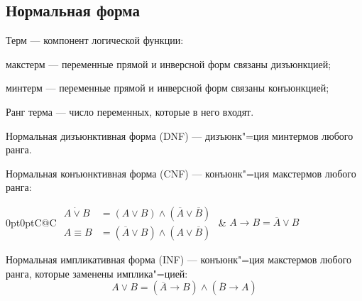 \subsection{Нормальная форма}

{\bold Терм} --- компонент логической функции:

\begin{list*}
\item{\bold макстерм} --- переменные прямой и инверсной форм связаны {\ital дизъюнкцией};
\item{\bold минтерм} --- переменные прямой и инверсной форм связаны {\ital конъюнкцией};
\end{list*}

{\bold Ранг} {\ital терма} --- число переменных, которые в него входят.

{\bold Нормальная дизъюнктивная форма} {\ital (DNF)} --- дизъюнк"=ция минтермов любого ранга.

{\bold Нормальная конъюнктивная форма} {\ital (CNF)} --- конъюнк"=ция макстермов любого ранга:
\begin{theorem}
\begin{tabularcx}{0pt}{0pt}{C@{\hspace*{-16pt}}C}{\textwidth}
$\begin{aligned}
A\dot{\lor}B&=(A\lor B)\land(\overline{A}\lor\overline{B})\\
A\equiv B&=(\overline{A}\lor B)\land(A\lor\overline{B})
\end{aligned}$\hspace*{-18pt} & $A\rightarrow B=\overline{A}\lor B$
\end{tabularcx}
\end{theorem}
{\bold Нормальная импликативная форма} {\ital (INF)} --- конъюнк"=ция макстермов любого ранга, которые заменены имплика"=цией:
$$A\lor B=(\overline{A}\rightarrow B)\land(\overline{B}\to A)$$
